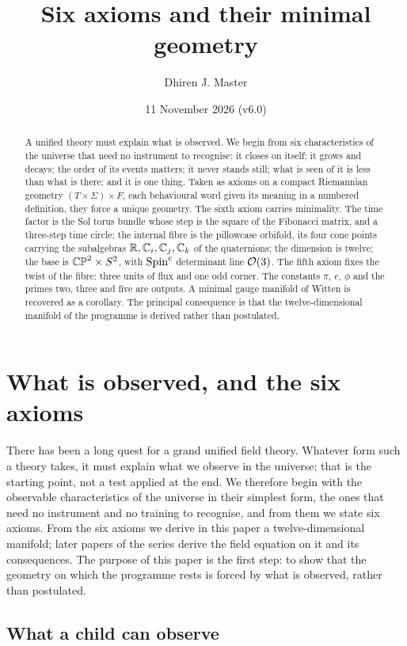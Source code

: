 \documentclass[11pt,a4paper]{article}
\title{Six axioms and their minimal geometry}
\author{Dhiren J. Master}
\date{11 November 2026 (v6.0)}
\theoremstyle{plain}
\theoremstyle{definition}
\theoremstyle{remark}
\begin{document}
\maketitle

\begin{abstract}
A unified theory must explain what is observed. We begin from six characteristics of the universe that need no instrument to recognise: it closes on itself; it grows and decays; the order of its events matters; it never stands still; what is seen of it is less than what is there; and it is one thing. Taken as axioms on a compact Riemannian geometry $(T\times\Sigma)\times F$, each behavioural word given its meaning in a numbered definition, they force a unique geometry. The sixth axiom carries minimality. The time factor is the Sol torus bundle whose step is the square of the Fibonacci matrix, and a three-step time circle; the internal fibre is the pillowcase orbifold, its four cone points carrying the subalgebras $\mathbb{R},\mathbb{C}_i,\mathbb{C}_j,\mathbb{C}_k$ of the quaternions; the dimension is twelve; the base is $\mathbb{CP}^2\times S^2$, with $\text{Spin}^c$ determinant line $\mathcal{O}(3)$. The fifth axiom fixes the twist of the fibre: three units of flux and one odd corner. The constants $\pi$, $e$, $\phi$ and the primes two, three and five are outputs. A minimal gauge manifold of Witten is recovered as a corollary. The principal consequence is that the twelve-dimensional manifold of the programme is derived rather than postulated.
\end{abstract}

\section{What is observed, and the six axioms}\label{sec:intro}

There has been a long quest for a grand unified field theory. Whatever form such a theory takes, it must explain what we observe in the universe; that is the starting point, not a test applied at the end. We therefore begin with the observable characteristics of the universe in their simplest form, the ones that need no instrument and no training to recognise, and from them we state six axioms. From the six axioms we derive in this paper a twelve-dimensional manifold; later papers of the series derive the field equation on it and its consequences. The purpose of this paper is the first step: to show that the geometry on which the programme rests is forced by what is observed, rather than postulated.

\subsection{What a child can observe}\label{sec:observe}
\end{document}
